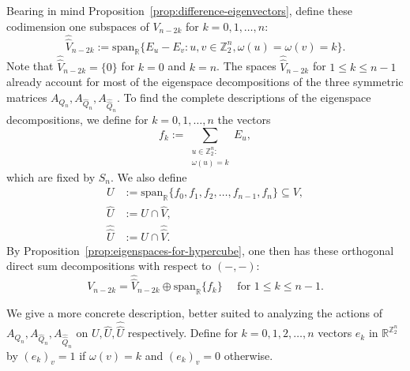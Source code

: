 \documentclass[10pt]{amsart}
\theoremstyle{plain}
\newcommand{\ZZ}{\mathbb{Z}}
\newcommand{\RR}{\mathbb{R}}
\newcommand{\spn}{\mathrm{span}}
\begin{document}
Bearing in mind Proposition~\ref{prop:difference-eigenvectors}, define these codimension one subspaces of
$V_{n-2k}$ for $k=0,1,\ldots,n$:
\begin{equation}
\label{eq:common-eigenspaces}
\hat{\hat{V}}_{n-2k}:=
\spn_\RR\{E_u-E_v: u,v \in \ZZ_2^n, \omega(u)=\omega(v)=k\}.
\end{equation}
Note that \( \hat{\hat{V}}_{n-2k}=\{0\} \) for \( k=0 \) and \( k=n \).
The spaces \( \hat{\hat{V}}_{n-2k} \) for \( 1\le k\le n-1 \) already account for most of the eigenspace decompositions of the three symmetric matrices $A_{Q_n}, A_{\hat{Q}_n}, A_{\hat{\hat{Q}}_n}$.
To find the complete descriptions of the eigenspace decompositions, we define
for $k=0,1,\ldots,n$ the vectors 
\[
  f_k:=\sum_{\substack{u \in \ZZ_2^n:\\\omega(u)=k}} E_u,
\]
which are fixed by $S_n$. We also define
\begin{align*}
U &:=\spn_\RR\{f_0,f_1,f_2,\ldots,f_{n-1},f_n\} \subseteq V,\\
\hat{U}&:= U\cap\hat{V},\\
\hat{\hat{U}}&:= U\cap\hat{\hat{V}}.
\end{align*}
By Proposition~\ref{prop:eigenspaces-for-hypercube}, 
one then has these orthogonal direct sum decompositions with respect to $(-,-)$:
$$
V_{n-2k}=\hat{\hat{V}}_{n-2k}
\oplus \spn_\RR \{f_k\}
\quad \text{ for }1\le k\le n-1.
$$

We give a more concrete description, better suited to analyzing the actions of  
$A_{Q_n}, A_{\hat{Q}_n}, A_{\hat{\hat{Q}}_n}$ on $U, \hat{U},\hat{\hat{U}}$ respectively.
Define for $k=0,1,2,\ldots,n$ vectors
$e_k$ in $\RR^{\ZZ_2^n}$ by
$(e_k)_v=1$ if $\omega(v)=k$ and
$(e_k)_v=0$ otherwise.
\end{document}
